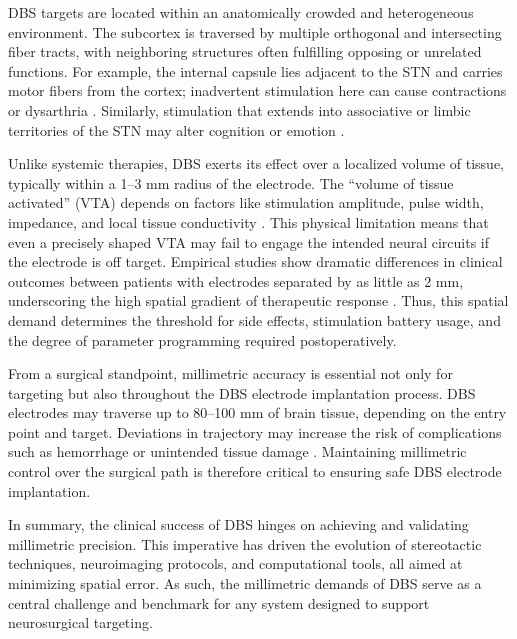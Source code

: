 DBS targets are located within an anatomically crowded and heterogeneous environment. The subcortex is traversed by multiple orthogonal and intersecting fiber tracts, with neighboring structures often fulfilling opposing or unrelated functions. For example, the internal capsule lies adjacent to the STN and carries motor fibers from the cortex; inadvertent stimulation here can cause contractions or dysarthria \cite{Tripoliti2011-ca}. Similarly, stimulation that extends into associative or limbic territories of the STN may alter cognition or emotion \cite{Mallet2007-ur}.

Unlike systemic therapies, DBS exerts its effect over a localized volume of tissue, typically within a 1–3 mm radius of the electrode. The “volume of tissue activated” (VTA) depends on factors like stimulation amplitude, pulse width, impedance, and local tissue conductivity \cite{McIntyre2006-wh,Butson2007-bn}. This physical limitation means that even a precisely shaped VTA may fail to engage the intended neural circuits if the electrode is off target. Empirical studies show dramatic differences in clinical outcomes between patients with electrodes separated by as little as 2 mm, underscoring the high spatial gradient of therapeutic response \cite{Horn2018-qq, Maks2009-ci}. Thus, this spatial demand determines the threshold for side effects, stimulation battery usage, and the degree of parameter programming required postoperatively. 

From a surgical standpoint, millimetric accuracy is essential not only for targeting but also throughout the DBS electrode implantation process. DBS electrodes may traverse up to 80–100 mm of brain tissue, depending on the entry point and target. Deviations in trajectory may increase the risk of complications such as hemorrhage or unintended tissue damage \cite{Ben-Haim2009-os,Rajabian2023-st}. Maintaining millimetric control over the surgical path is therefore critical to ensuring safe DBS electrode implantation.
 
In summary, the clinical success of DBS hinges on achieving and validating millimetric precision. This imperative has driven the evolution of stereotactic techniques, neuroimaging protocols, and computational tools, all aimed at minimizing spatial error. As such, the millimetric demands of DBS serve as a central challenge and benchmark for any system designed to support neurosurgical targeting.


